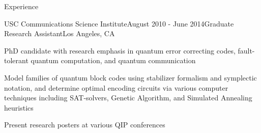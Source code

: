 \documentclass{resume} %
\begin{document}
\begin{rSection}{Experience}
\begin{rSubsection}{USC Communications Science Institute}{August 2010 - June 2014}{Graduate Research Assistant}{Los Angeles, CA}
\item PhD candidate with research emphasis in quantum error correcting codes, fault-tolerant quantum computation, and quantum communication
\item Model families of quantum block codes using stabilizer formalism and symplectic notation, and determine optimal encoding circuits via various computer techniques including SAT-solvers, Genetic Algorithm, and Simulated Annealing heuristics
\item Present research posters at various QIP conferences
\end{rSubsection}





\end{rSection}
\end{document}
